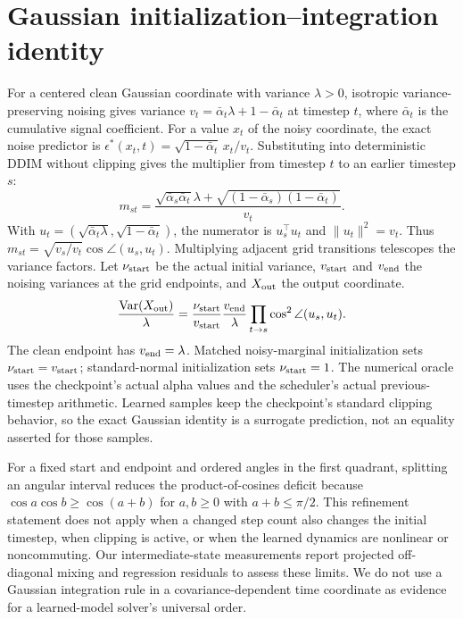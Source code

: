 \section{Gaussian initialization--integration identity}
\label{supp:gaussian}
For a centered clean Gaussian coordinate with variance $\lambda>0$, isotropic
variance-preserving noising gives variance $v_t=\bar\alpha_t\lambda+1-\bar\alpha_t$
at timestep $t$, where $\bar\alpha_t$ is the cumulative signal coefficient.
For a value $x_t$ of the noisy coordinate, the exact noise predictor is
$\epsilon^*(x_t,t)=\sqrt{1-\bar\alpha_t}\,x_t/v_t$.
Substituting into deterministic DDIM without clipping gives the multiplier
from timestep $t$ to an earlier timestep $s$:
\begin{equation}
m_{st}=\frac{\sqrt{\bar\alpha_s\bar\alpha_t}\lambda+
\sqrt{(1-\bar\alpha_s)(1-\bar\alpha_t)}}{v_t}.
\label{eq:supp_ddim_step}
\end{equation}
With $u_t=(\sqrt{\bar\alpha_t\lambda},\sqrt{1-\bar\alpha_t})$,
the numerator is $u_s^\top u_t$ and $\|u_t\|^2=v_t$. Thus
$m_{st}=\sqrt{v_s/v_t}\cos\angle(u_s,u_t)$.
Multiplying adjacent grid transitions telescopes the variance factors.
Let $\nu_{\rm start}$ be the actual initial variance, $v_{\rm start}$ and
$v_{\rm end}$ the noising variances at the grid endpoints, and
$X_{\rm out}$ the output coordinate.
\begin{equation}
\frac{\operatorname{Var}(X_{\rm out})}{\lambda}
=\frac{\nu_{\rm start}}{v_{\rm start}}
\frac{v_{\rm end}}{\lambda}
\prod_{t\rightarrow s}\cos^2\angle(u_s,u_t).
\label{eq:supp_ddim_variance}
\end{equation}
The clean endpoint has $v_{\rm end}=\lambda$.
Matched noisy-marginal initialization sets $\nu_{\rm start}=v_{\rm start}$;
standard-normal initialization sets $\nu_{\rm start}=1$.
The numerical oracle uses the checkpoint's actual alpha values and the
scheduler's actual previous-timestep arithmetic. Learned samples keep the
checkpoint's standard clipping behavior, so the exact Gaussian identity is a
surrogate prediction, not an equality asserted for those samples.

For a fixed start and endpoint and ordered angles in the first quadrant,
splitting an angular interval reduces the product-of-cosines deficit because
$\cos a\cos b\geq\cos(a+b)$ for $a,b\geq0$ with $a+b\leq\pi/2$.
This refinement statement does not apply when a changed step count also changes
the initial timestep, when clipping is active, or when the learned dynamics
are nonlinear or noncommuting. Our intermediate-state measurements report
projected off-diagonal mixing and regression residuals to assess these limits.
We do not use a Gaussian integration rule in a covariance-dependent time
coordinate as evidence for a learned-model solver's universal order.
